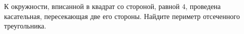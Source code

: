 \begin{ex}
	\begin{condition}
		К окружности, вписанной в квадрат со стороной, равной \( 4 \), проведена касательная, пересекающая две его стороны. Найдите периметр отсеченного треугольника.
	\end{condition}
\end{ex}